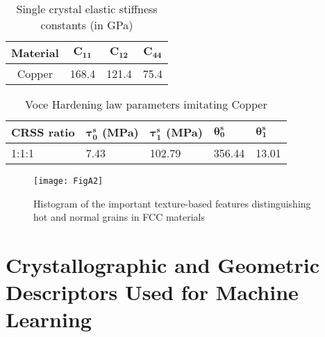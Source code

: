 \documentclass[preprint,1p,times,authoryear]{elsarticle}%
\begin{document}
\begin{table}[!btp]
\centering
\caption{Single crystal elastic stiffness constants  (in GPa)}
\label{HCPelastic1}
\begin{tabular}{*{4}{c}}
\toprule 
\multicolumn{1}{c}{Material} & \multicolumn{1}{c}{$\mathbf{C_{11}}$} & \multicolumn{1}{c}{$\mathbf{C_{12}}$} & \multicolumn{1}{c}{$\mathbf{C_{44}}$}\\ \midrule
Copper&168.4 &121.4 &75.4\\
\bottomrule
\end{tabular}
\end{table}

\begin{table}[!t]
\centering
\caption{Voce Hardening law parameters imitating Copper}%
\label{Voce}
\begin{tabular}{p{1cm} p{1cm} p{1cm} p{1cm} p{0.8cm}}
\toprule \textbf{CRSS ratio} & $\mathbf{\tau_0^s}$ (MPa) & $\mathbf{\tau_1^s}$ (MPa) & $\mathbf{\theta_0^s}$ & $\mathbf{\theta_1^s}$\\ \midrule
1:1:1 & 7.43 & 102.79 & 356.44 &13.01 \\
\bottomrule
\end{tabular}
\end{table}

\begin{figure}[t]
    \centering
    \texttt{[image: FigA2]}%
    \caption{Histogram of the important texture-based features distinguishing hot and normal grains in FCC materials}
    \label{fig:FCC_featurehist}
\end{figure}

\clearpage
\section{Crystallographic and Geometric Descriptors Used for Machine Learning} \label{Table of Acronyms} 
\end{document}

